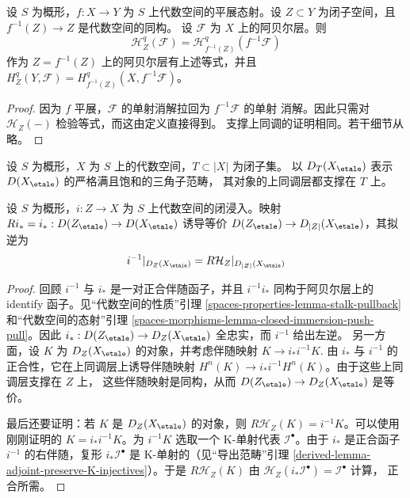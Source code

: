 \begin{lemma}
\label{lemma-etale-localization-sheaf-with-support}
设 $S$ 为概形，$f : X \to Y$ 为 $S$ 上代数空间的平展态射。设
$Z \subset Y$ 为闭子空间，且 $f^{-1}(Z) \to Z$ 是代数空间的同构。
设 $\mathcal{F}$ 为 $X$ 上的阿贝尔层。则
$$
\mathcal{H}^q_Z(\mathcal{F}) = \mathcal{H}^q_{f^{-1}(Z)}(f^{-1}\mathcal{F})
$$
作为 $Z = f^{-1}(Z)$ 上的阿贝尔层有上述等式，并且
$H^q_Z(Y, \mathcal{F}) = H^q_{f^{-1}(Z)}(X, f^{-1}\mathcal{F})$。
\end{lemma}

\begin{proof}
因为 $f$ 平展，$\mathcal{F}$ 的单射消解拉回为 $f^{-1}\mathcal{F}$ 的单射
消解。因此只需对 $\mathcal{H}_Z(-)$ 检验等式，而这由定义直接得到。
支撑上同调的证明相同。若干细节从略。
\end{proof}

\noindent
设 $S$ 为概形，$X$ 为 $S$ 上的代数空间，$T \subset |X|$ 为闭子集。
以 $D_T(X_\etale)$ 表示 $D(X_\etale)$ 的严格满且饱和的三角子范畴，
其对象的上同调层都支撑在 $T$ 上。

\begin{lemma}
\label{lemma-complexes-with-support-on-closed}
设 $S$ 为概形，$i : Z \to X$ 为 $S$ 上代数空间的闭浸入。映射
$Ri_* = i_* : D(Z_\etale) \to D(X_\etale)$ 诱导等价
$D(Z_\etale) \to D_{|Z|}(X_\etale)$，其拟逆为
$$
i^{-1}|_{D_Z(X_\etale)} = R\mathcal{H}_Z|_{D_{|Z|}(X_\etale)}
$$
\end{lemma}

\begin{proof}
回顾 $i^{-1}$ 与 $i_*$ 是一对正合伴随函子，并且
$i^{-1}i_*$ 同构于阿贝尔层上的 identify 函子。见“代数空间的性质”引理
\ref{spaces-properties-lemma-stalk-pullback} 和“代数空间的态射”引理
\ref{spaces-morphisms-lemma-closed-immersion-push-pull}。因此
$i_* : D(Z_\etale) \to D_Z(X_\etale)$ 全忠实，而 $i^{-1}$ 给出左逆。
另一方面，设 $K$ 为 $D_Z(X_\etale)$ 的对象，并考虑伴随映射
$K \to i_*i^{-1}K$.
由 $i_*$ 与 $i^{-1}$ 的正合性，它在上同调层上诱导伴随映射
$H^n(K) \to i_*i^{-1}H^n(K)$。由于这些上同调层支撑在 $Z$ 上，
这些伴随映射是同构，从而 $D(Z_\etale) \to D_Z(X_\etale)$ 是等价。

\medskip\noindent
最后还要证明：若 $K$ 是 $D_Z(X_\etale)$ 的对象，则
$R\mathcal{H}_Z(K) = i^{-1}K$。可以使用刚刚证明的
$K = i_*i^{-1}K$。为 $i^{-1}K$ 选取一个 K-单射代表
$\mathcal{I}^\bullet$。由于 $i_*$ 是正合函子 $i^{-1}$ 的右伴随，复形
$i_*\mathcal{I}^\bullet$ 是 K-单射的（见“导出范畴”引理
\ref{derived-lemma-adjoint-preserve-K-injectives}）。于是
$R\mathcal{H}_Z(K)$ 由
$\mathcal{H}_Z(i_*\mathcal{I}^\bullet) = \mathcal{I}^\bullet$ 计算，
正合所需。
\end{proof}






